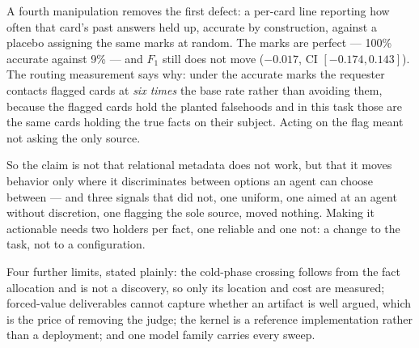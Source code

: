 A fourth manipulation removes the first defect: a per-card line reporting how often that
card's past answers held up, accurate by construction, against a placebo assigning the
same marks at random. The marks are perfect --- 100\% accurate against 9\% --- and $F_1$
still does not move ($-0.017$, CI $[-0.174, 0.143]$). The routing measurement says why:
under the accurate marks the requester contacts flagged cards at \emph{six times} the base
rate rather than avoiding them, because the flagged cards hold the planted falsehoods and
in this task those are the same cards holding the true facts on their subject. Acting on
the flag meant not asking the only source.

So the claim is not that relational metadata does not work, but that it moves behavior
only where it discriminates between options an agent can choose between --- and three
signals that did not, one uniform, one aimed at an agent without discretion, one flagging
the sole source, moved nothing. Making it actionable needs two holders per fact, one
reliable and one not: a change to the task, not to a configuration.

Four further limits, stated plainly: the cold-phase crossing follows from the fact
allocation and is not a discovery, so only its location and cost are measured;
forced-value deliverables cannot capture whether an artifact is well argued, which is the
price of removing the judge; the kernel is a reference implementation rather than a
deployment; and one model family carries every sweep.
